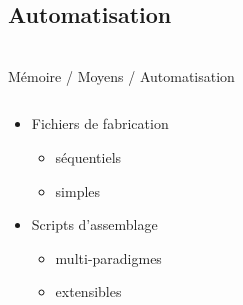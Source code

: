 \subsection{Automatisation}\begin{frame}
{\bititle\\Mémoire / Moyens / Automatisation}
\begin{columns}\begin{column}{.5\textwidth}\begin{itemize}
\item<1-> Fichiers de fabrication\begin{itemize}
    \item<2-> séquentiels
    \item<3-> simples\end{itemize}
\vspace{3em}
\item<5-> Scripts d’assemblage\begin{itemize}
    \item<6-> multi-paradigmes
    \item<7-> extensibles\end{itemize}\end{itemize}
\end{column}\begin{column}{.5\textwidth}
\vspace{1em}
\end{column}\end{columns}\end{frame}
